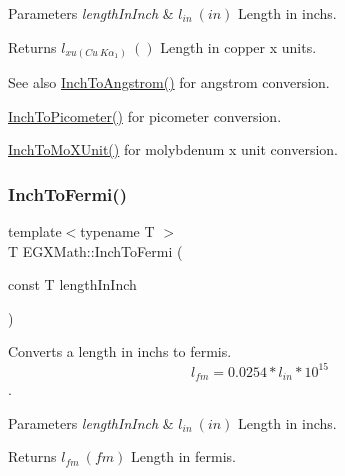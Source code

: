 \begin{DoxyParams}{Parameters}
{\em length\+In\+Inch} & $ l_{in}\ (in)$ Length in inchs. \\
\hline
\end{DoxyParams}
\begin{DoxyReturn}{Returns}
$ l_{xu(Cu\ K\alpha_1)}\ ()$ Length in copper x units. 
\end{DoxyReturn}
\begin{DoxySeeAlso}{See also}
\mbox{\hyperlink{group___e_g_x_math-_conversions-_length_conversions-_imperial-_inch-_non-_s_i_ga37c2030e31292fe77b024bffaf4c7f9b}{Inch\+To\+Angstrom()}} for angstrom conversion. 

\mbox{\hyperlink{group___e_g_x_math-_conversions-_length_conversions-_imperial-_inch-_s_i_ga4220728877d0369e359689a0d8f8207c}{Inch\+To\+Picometer()}} for picometer conversion. 

\mbox{\hyperlink{group___e_g_x_math-_conversions-_length_conversions-_imperial-_inch-_non-_s_i_ga938a029b99c57c1b765ebf23e82dee6e}{Inch\+To\+Mo\+X\+Unit()}} for molybdenum x unit conversion. 
\end{DoxySeeAlso}
\mbox{\label{group___e_g_x_math-_conversions-_length_conversions-_imperial-_inch-_non-_s_i_ga60087eace30a405617328d7c3ac3efb3}} 
\subsubsection{\texorpdfstring{Inch\+To\+Fermi()}{InchToFermi()}}
{\footnotesize\ttfamily template$<$typename T $>$ \\
T E\+G\+X\+Math\+::\+Inch\+To\+Fermi (\begin{DoxyParamCaption}\item[{const T}]{length\+In\+Inch }\end{DoxyParamCaption})}



Converts a length in inchs to fermis. \[ l_{fm}=0.0254 * l_{in} * 10^{15} \]. 


\begin{DoxyParams}{Parameters}
{\em length\+In\+Inch} & $ l_{in}\ (in)$ Length in inchs. \\
\hline
\end{DoxyParams}
\begin{DoxyReturn}{Returns}
$ l_{fm}\ (fm)$ Length in fermis. 
\end{DoxyReturn}
\mbox{\label{group___e_g_x_math-_conversions-_length_conversions-_imperial-_inch-_non-_s_i_ga28d3076041cdf54ce5c25f834fb16128}} 

